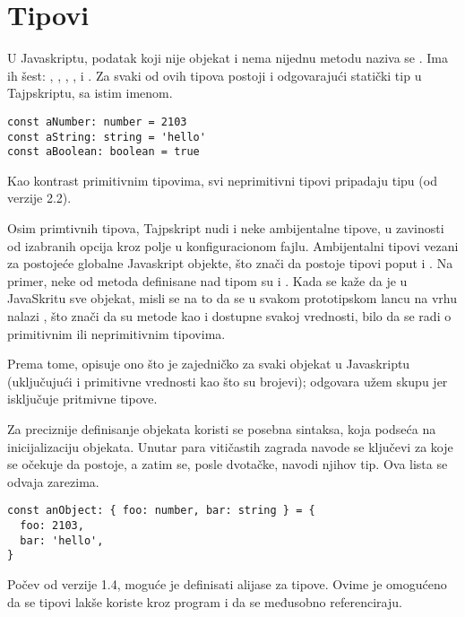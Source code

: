 \section{Tipovi}

U Javaskriptu, podatak koji nije objekat i nema nijednu metodu naziva se .
Ima ih šest: , , , ,  i .
Za svaki od ovih tipova postoji i odgovarajući statički tip u Tajpskriptu, sa istim imenom.

\begin{verbatim}
const aNumber: number = 2103
const aString: string = 'hello'
const aBoolean: boolean = true
\end{verbatim}

Kao kontrast primitivnim tipovima, svi neprimitivni tipovi pripadaju tipu  (od verzije 2.2).

Osim primtivnih tipova, Tajpskript nudi i neke ambijentalne tipove, u zavinosti od izabranih opcija kroz polje  u konfiguracionom fajlu.
Ambijentalni tipovi vezani za postojeće globalne Javaskript objekte, što znači da postoje tipovi poput  i .
Na primer, neke od metoda definisane nad tipom  su  i .
Kada se kaže da je u JavaSkritu sve objekat, misli se na to da se u svakom prototipskom lancu na vrhu nalazi , što znači da su metode kao  i  dostupne svakoj vrednosti, bilo da se radi o primitivnim ili neprimitivnim tipovima.

Prema tome,  opisuje ono što je zajedničko za svaki objekat u Javaskriptu (uključujući i primitivne vrednosti kao što su brojevi);  odgovara užem skupu jer isključuje pritmivne tipove.

Za preciznije definisanje objekata koristi se posebna sintaksa, koja podseća na inicijalizaciju objekata.
Unutar para vitičastih zagrada navode se ključevi za koje se očekuje da postoje, a zatim se, posle dvotačke, navodi njihov tip.
Ova lista se odvaja zarezima.

\begin{verbatim}
const anObject: { foo: number, bar: string } = {
  foo: 2103,
  bar: 'hello',
}
\end{verbatim}

Počev od verzije 1.4, moguće je definisati alijase za tipove.
Ovime je omogućeno da se tipovi lakše koriste kroz program i da se međusobno referenciraju.

